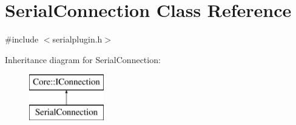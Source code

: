 \hypertarget{class_serial_connection}{\section{\-Serial\-Connection \-Class \-Reference}
\label{class_serial_connection}
}


{\ttfamily \#include $<$serialplugin.\-h$>$}

\-Inheritance diagram for \-Serial\-Connection\-:\begin{figure}[H]
\begin{center}
\leavevmode
\includegraphics[height=2.000000cm]{class_serial_connection}
\end{center}
\end{figure}
